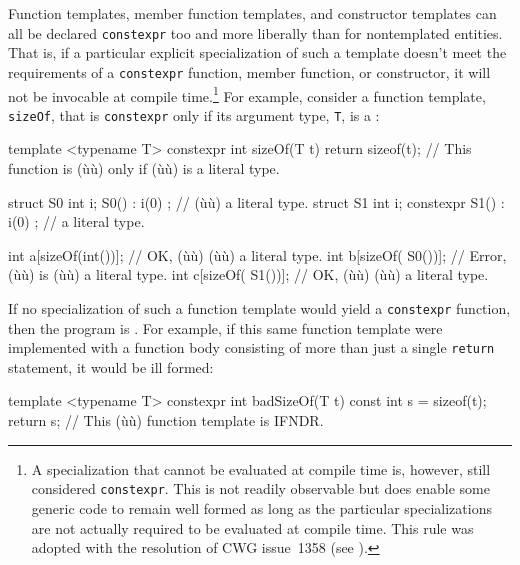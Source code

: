 Function templates, member function templates, and constructor templates
can all be declared \lstinline!constexpr! too and more liberally than for
nontemplated entities. That is, if a particular explicit specialization
of such a template doesn't meet the requirements of a \lstinline!constexpr!
function, member function, or constructor, it will not be invocable at
compile time.{\cprotect\footnote{A specialization that cannot be
evaluated at compile time is, however, still considered
\lstinline!constexpr!. This is not readily observable but does enable
some generic code to remain well formed as long as the particular
specializations are not actually required to be evaluated at compile
time. This rule was adopted with the resolution of CWG issue~1358 (see
  \cite{smith11}).}} For example, consider a function
template, \lstinline!sizeOf!, that is \lstinline!constexpr! only if its
argument type, \lstinline!T!, is a :

\begin{emcppslisting}[emcppsbatch=e7]
template <typename T> constexpr int sizeOf(T t) { return sizeof(t); }
    // This function is (ù{}ù) only if (ù{}ù) is a literal type.

struct S0 { int i;           S0() : i(0) { } };  // (ù{}ù) a literal type.
struct S1 { int i; constexpr S1() : i(0) { } };  // a literal type.

int a[sizeOf(int())];  // OK,    (ù{}ù) (ù{}ù)     a literal type.
int b[sizeOf( S0())];  // Error,  (ù{}ù) is (ù{}ù) a literal type.
int c[sizeOf( S1())];  // OK,     (ù{}ù) (ù{}ù)     a literal type.
\end{emcppslisting}
    

\noindent If no specialization of such a function template would yield a
\lstinline!constexpr! function, then the program is . For
example, if this same function template were implemented with a function
body consisting of more than just a single \lstinline!return! statement, it
would be ill formed:

\begin{emcppslisting}[emcppsbatch=e7,emcppsignore={IFNDR, clang c++11 catches this}]
template <typename T>
constexpr int badSizeOf(T t) { const int s = sizeof(t); return s; }
    // This (ù{}ù) function template is IFNDR.
\end{emcppslisting}
    

